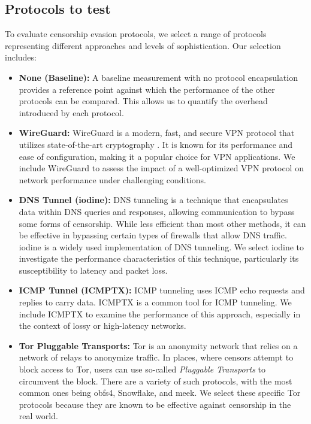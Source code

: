 \subsection{Protocols to test}

To evaluate censorship evasion protocols, we select a range of protocols representing different approaches and levels of sophistication.
Our selection includes:

\begin{itemize}
  \item \noindent\textbf{None (Baseline):}
    A baseline measurement with no protocol encapsulation provides a reference point against which the performance of the other protocols can be compared.
    This allows us to quantify the overhead introduced by each protocol.

  \item \noindent\textbf{WireGuard:}
    WireGuard is a modern, fast, and secure VPN protocol that utilizes state-of-the-art cryptography \cite{donenfeld2017wireguard}.
    It is known for its performance and ease of configuration, making it a popular choice for VPN applications.
    We include WireGuard to assess the impact of a well-optimized VPN protocol on network performance under challenging conditions.

  \item \noindent\textbf{DNS Tunnel (iodine):}
    DNS tunneling is a technique that encapsulates data within DNS queries and responses, allowing communication to bypass some forms of censorship.
    While less efficient than most other methods, it can be effective in bypassing certain types of firewalls that allow DNS traffic.
    iodine is a widely used implementation of DNS tunneling.
    We select iodine to investigate the performance characteristics of this technique, particularly its susceptibility to latency and packet loss.

  \item \noindent\textbf{ICMP Tunnel (ICMPTX):}
    ICMP tunneling uses ICMP echo requests and replies to carry data.
    ICMPTX is a common tool for ICMP tunneling.
    We include ICMPTX to examine the performance of this approach, especially in the context of lossy or high-latency networks.

  \item \noindent\textbf{Tor Pluggable Transports:}
    Tor is an anonymity network that relies on a network of relays to anonymize traffic.
    In places, where censors attempt to block access to Tor, users can use so-called \textit{Pluggable Transports} to circumvent the block.
    There are a variety of such protocols, with the most common ones being obfs4, Snowflake, and meek.
    We select these specific Tor protocols because they are known to be effective against censorship in the real world.
\end{itemize}



